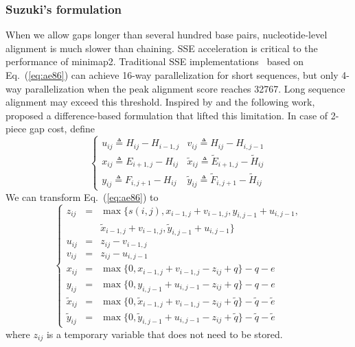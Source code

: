 \documentclass{bioinfo}
\begin{document}
\begin{methods}
\subsubsection{Suzuki's formulation}

When we allow gaps longer than several hundred base pairs, nucleotide-level
alignment is much slower than chaining. SSE acceleration is critical to the
performance of minimap2. Traditional SSE implementations~\citep{Farrar:2007hs}
based on Eq.~(\ref{eq:ae86}) can achieve 16-way parallelization for short
sequences, but only 4-way parallelization when the peak alignment score reaches
32767. Long sequence alignment may exceed this threshold. Inspired by
\citet{Wu:1996aa} and the following work, \citet{Suzuki:2016} proposed a
difference-based formulation that lifted this limitation.
In case of 2-piece gap cost, define
\[
\left\{\begin{array}{ll}
u_{ij}\triangleq H_{ij}-H_{i-1,j} & v_{ij}\triangleq H_{ij}-H_{i,j-1} \\
x_{ij}\triangleq E_{i+1,j}-H_{ij} & \tilde{x}_{ij}\triangleq \tilde{E}_{i+1,j}-\tilde{H}_{ij} \\
y_{ij}\triangleq F_{i,j+1}-H_{ij} & \tilde{y}_{ij}\triangleq \tilde{F}_{i,j+1}-\tilde{H}_{ij}
\end{array}\right.
\]
We can transform Eq.~(\ref{eq:ae86}) to
\begin{equation}\label{eq:suzuki}
\left\{\begin{array}{lll}
z_{ij}&=&\max\{s(i,j),x_{i-1,j}+v_{i-1,j},y_{i,j-1}+u_{i,j-1},\\
&&\tilde{x}_{i-1,j}+v_{i-1,j},\tilde{y}_{i,j-1}+u_{i,j-1}\}\\
u_{ij}&=&z_{ij}-v_{i-1,j}\\
v_{ij}&=&z_{ij}-u_{i,j-1}\\
x_{ij}&=&\max\{0,x_{i-1,j}+v_{i-1,j}-z_{ij}+q\}-q-e\\
y_{ij}&=&\max\{0,y_{i,j-1}+u_{i,j-1}-z_{ij}+q\}-q-e\\
\tilde{x}_{ij}&=&\max\{0,\tilde{x}_{i-1,j}+v_{i-1,j}-z_{ij}+\tilde{q}\}-\tilde{q}-\tilde{e}\\
\tilde{y}_{ij}&=&\max\{0,\tilde{y}_{i,j-1}+u_{i,j-1}-z_{ij}+\tilde{q}\}-\tilde{q}-\tilde{e}
\end{array}\right.
\end{equation}
where $z_{ij}$ is a temporary variable that does not need to be stored.


\end{methods}
\end{document}
